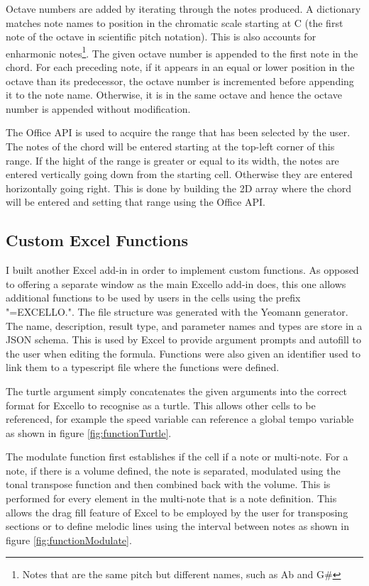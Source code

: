 Octave numbers are added by iterating through the notes produced. A dictionary matches note names to position in the chromatic scale starting at C (the first note of the octave in scientific pitch notation). This is also accounts for enharmonic notes\footnote{Notes that are the same pitch but different names, such as Ab and G\#}. The given octave number is appended to the first note in the chord. For each preceding note, if it appears in an equal or lower position in the octave than its predecessor, the octave number is incremented before appending it to the note name. Otherwise, it is in the same octave and hence the octave number is appended without modification.

The Office API is used to acquire the range that has been selected by the user. The notes of the chord will be entered starting at the top-left corner of this range. If the hight of the range is greater or equal to its width, the notes are entered vertically going down from the starting cell. Otherwise they are entered horizontally going right. This is done by building the 2D array where the chord will be entered and setting that range using the Office API.

\subsection{Custom Excel Functions}

I built another Excel add-in in order to implement custom functions. As opposed to offering a separate window as the main Excello add-in does, this one allows additional functions to be used by users in the cells using the prefix "=EXCELLO.". The file structure was generated with the Yeomann generator. The name, description, result type, and parameter names and types are store in a JSON schema. This is used by Excel to provide argument prompts and autofill to the user when editing the formula. Functions were also given an identifier used to link them to a typescript file where the functions were defined.

The turtle argument simply concatenates the given arguments into the correct format for Excello to recognise as a turtle. This allows other cells to be referenced, for example the speed variable can reference a global tempo variable as shown in figure \ref{fig:functionTurtle}.

The modulate function first establishes if the cell if a note or multi-note. For a note, if there is a volume defined, the note is separated, modulated using the tonal transpose function and then combined back with the volume. This is performed for every element in the multi-note that is a note definition. This allows the drag fill feature of Excel to be employed by the user for transposing sections or to define melodic lines using the interval between notes as shown in figure \ref{fig:functionModulate}.

